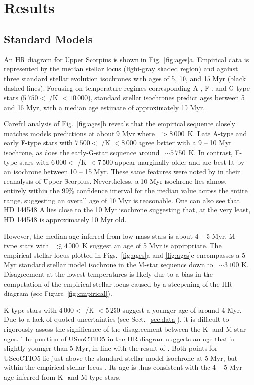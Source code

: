 \documentclass{aa}
\begin{document}
\section{Results}
\label{sec:results}

\subsection{Standard Models}
An HR diagram for Upper Scorpius is shown in Fig.~\ref{fig:ages}a. Empirical data is represented by the median stellar locus (light-gray shaded region) and against three standard stellar evolution isochrones with ages of 5, 10, and 15 Myr (black dashed lines). Focusing on temperature regimes corresponding A-, F-, and G-type stars ($5\,750 <$ \teff/K $< 10\,000$), standard stellar isochrones predict ages between 5 and 15 Myr, with a median age estimate of approximately 10 Myr. 

Careful analysis of Fig.~\ref{fig:ages}b reveals that the empirical sequence closely matches models predictions at about 9 Myr where \teff~$> 8\,000$~K. Late A-type and early F-type stars with $7\,500 < $ \teff/K $ < 8\,000$ agree better with a 9 -- 10 Myr isochrone, as does the early-G-star sequence around \teff\ $\sim 5\,750$~K. In contrast, F-type stars with $6\,000 <$ \teff/K $< 7\,500$ appear marginally older and are best fit by an isochrone between 10 -- 15 Myr. These same features were noted by \citet{Pecaut2012} in their reanalysis of Upper Scorpius. Nevertheless, a 10 Myr isochrone lies almost entirely within the 99\% confidence interval for the median value across the entire range, suggesting an overall age of 10 Myr is reasonable. One can also see that HD 144548 A lies close to the 10 Myr isochrone suggesting that, at the very least, HD 144548 is approximately 10 Myr old.

However, the median age inferred from low-mass stars is about 4 -- 5 Myr. M-type stars with \teff\ $\lesssim 4\,000$~K suggest an age of 5 Myr is appropriate. The empirical stellar locus plotted in Figs.~\ref{fig:ages}a and \ref{fig:ages}c encompasses a 5 Myr standard stellar model isochrone in the M-star sequence down to \teff\ $\sim3\,100$ K. Disagreement at the lowest temperatures is likely due to a bias in the computation of the empirical stellar locus caused by a steepening of the HR diagram (see Figure~\ref{fig:empirical}).

K-type stars with $4\,000 <$ \teff/K $< 5\,250$ suggest a younger age of around 4 Myr. Due to a lack of quoted uncertainties (see Sect.~\ref{sec:data}), it is difficult to rigorously assess the significance of the disagreement between the K- and M-star ages. The position of UScoCTIO5 in the HR diagram suggests an age that is slightly younger than 5 Myr, in line with the result of \citet{Kraus2015}. Both points for UScoCTIO5 lie just above the standard stellar model isochrone at 5 Myr, but within the empirical stellar locus \citep{Preibisch1999,Preibisch2002}. Its age is thus consistent with the 4 -- 5 Myr age inferred from K- and M-type stars.
\end{document}
